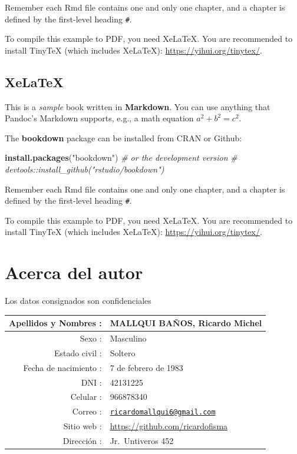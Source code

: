 \documentclass[]{krantz}
\newenvironment{Shaded}{\begin{snugshade}}{\end{snugshade}}
\newcommand{\CommentTok}[1]{\textcolor[rgb]{0.37,0.37,0.37}{\textit{#1}}}
\newcommand{\KeywordTok}[1]{\textcolor[rgb]{0.27,0.27,0.27}{\textbf{#1}}}
\newcommand{\NormalTok}[1]{#1}
\newcommand{\StringTok}[1]{\textcolor[rgb]{0.5,0.5,0.5}{#1}}
\begin{document}
Remember each Rmd file contains one and only one chapter, and a chapter is defined by the first-level heading \texttt{\#}.

To compile this example to PDF, you need XeLaTeX. You are recommended to install TinyTeX (which includes XeLaTeX): \url{https://yihui.org/tinytex/}.

\hypertarget{xelatex}{%
\section*{XeLaTeX}\label{xelatex}}

This is a \emph{sample} book written in \textbf{Markdown}. You can use anything that Pandoc's Markdown supports, e.g., a math equation \(a^2 + b^2 = c^2\).

The \textbf{bookdown} package can be installed from CRAN or Github:

\begin{Shaded}
\begin{Highlighting}[]
\KeywordTok{install.packages}\NormalTok{(}\StringTok{"bookdown"}\NormalTok{)}
\CommentTok{# or the development version}
\CommentTok{# devtools::install_github("rstudio/bookdown")}
\end{Highlighting}
\end{Shaded}

Remember each Rmd file contains one and only one chapter, and a chapter is defined by the first-level heading \texttt{\#}.

To compile this example to PDF, you need XeLaTeX. You are recommended to install TinyTeX (which includes XeLaTeX): \url{https://yihui.org/tinytex/}.

\hypertarget{acerca-del-autor}{%
\chapter*{Acerca del autor}\label{acerca-del-autor}}

Los datos consignados son confidenciales

\begin{longtable}[]{@{}rl@{}}
\toprule
Apellidos y Nombres : & MALLQUI BAÑOS, Ricardo Michel\tabularnewline
\midrule
\endhead
Sexo : & Masculino\tabularnewline
Estado civil : & Soltero\tabularnewline
Fecha de nacimiento : & 7 de febrero de 1983\tabularnewline
DNI : & 42131225\tabularnewline
Celular : & 966878340\tabularnewline
Correo : & \href{mailto:ricardomallqui6@gmail.com}{\nolinkurl{ricardomallqui6@gmail.com}}\tabularnewline
Sitio web : & \url{https://github.com/ricardofisma}\tabularnewline
Dirección : & Jr.~Untiveros 452\tabularnewline
\bottomrule
\end{longtable}
\end{document}
